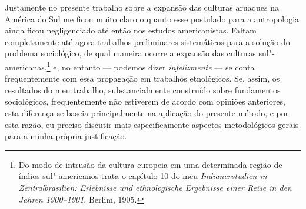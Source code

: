 {Justamente no presente trabalho sobre a expansão das culturas aruaques na
América do Sul me ficou muito claro o quanto esse postulado para a
antropologia ainda ficou negligenciado até então nos estudos
americanistas. Faltam completamente até agora trabalhos preliminares
sistemáticos para a solução do problema sociológico, de qual maneira
ocorre a expansão das culturas sul"-americanas,\footnote{Do modo de
  intrusão da cultura europeia em uma determinada região de índios
  sul"-americanos trata o capítulo 10 do meu \textit{Indianerstudien in
  Zentralbrasilien: Erlebnisse und ethnologische Ergebnisse einer Reise
  in den Jahren 1900--1901}, Berlim, 1905.} e, no entanto --- podemos dizer
\textit{infelizmente} --- se conta frequentemente com essa propagação em
trabalhos etnológicos. Se, assim, os resultados do meu trabalho,
substancialmente construído sobre fundamentos sociológicos,
frequentemente não estiverem de acordo com opiniões anteriores, esta
diferença se baseia principalmente na aplicação do presente método, e
por esta razão, eu preciso discutir mais especificamente aspectos
metodológicos gerais para a minha própria justificação.}


